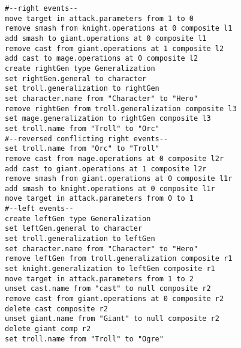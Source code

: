\vspace{-20pt}
\begin{lstlisting}[firstnumber=1,style=eol,caption={Merged change events (operations) of the models in Fig. \ref{fig:class_diagram_rpg} and Listings \ref{lst:cbp_right} and \ref{lst:cbp_left} using Epsilon CBP. The commented lines are added only to improve readability.},label=lst:cbp_merged_ecbp]
#--right events--
move target in attack.parameters from 1 to 0
remove smash from knight.operations at 0 composite l1
add smash to giant.operations at 0 composite l1
remove cast from giant.operations at 1 composite l2
add cast to mage.operations at 0 composite l2
create rightGen type Generalization
set rightGen.general to character
set troll.generalization to rightGen
set character.name from "Character" to "Hero"
remove rightGen from troll.generalization composite l3
set mage.generalization to rightGen composite l3
set troll.name from "Troll" to "Orc"
#--reversed conflicting right events--
set troll.name from "Orc" to "Troll"
remove cast from mage.operations at 0 composite l2r
add cast to giant.operations at 1 composite l2r
remove smash from giant.operations at 0 composite l1r
add smash to knight.operations at 0 composite l1r
move target in attack.parameters from 0 to 1
#--left events--
create leftGen type Generalization
set leftGen.general to character
set troll.generalization to leftGen
set character.name from "Character" to "Hero"
remove leftGen from troll.generalization composite r1
set knight.generalization to leftGen composite r1
move target in attack.parameters from 1 to 2
unset cast.name from "cast" to null composite r2
remove cast from giant.operations at 0 composite r2
delete cast composite r2
unset giant.name from "Giant" to null composite r2
delete giant comp r2
set troll.name from "Troll" to "Ogre"
\end{lstlisting}

